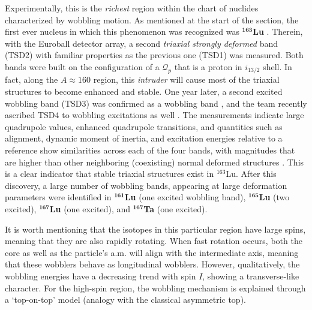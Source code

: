 Experimentally, this is the \emph{richest} region within the chart of nuclides characterized by wobbling motion. As mentioned at the start of the section, the first ever nucleus in which this phenomenon was recognized was $^\mathbf{163}$\textbf{Lu} \cite{odegaard2001evidence}. Therein, with the Euroball detector \cite{simpson1997euroball} array, a second \emph{triaxial strongly deformed} band (TSD2) with familiar properties as the previous one (TSD1) was measured. Both bands were built on the configuration of a $\mathcal{Q}_p$ that is a proton in $i_{13/2}$ shell. In fact, along the $A\approx 160$ region, this \emph{intruder} will cause most of the triaxial structures to become enhanced and stable. One year later, a second excited wobbling band (TSD3) was confirmed as a wobbling band \cite{jensen2002evidence}, and the team recently ascribed TSD4 to wobbling excitations as well \cite{raduta2020towards}. The measurements indicate large quadrupole values, enhanced quadrupole transitions, and quantities such as alignment, dynamic moment of inertia, and excitation energies relative to a reference show similarities across each of the four bands, with magnitudes that are higher than other neighboring (coexisting) normal deformed structures \cite{jensen2004coexisting}. This is a clear indicator that stable triaxial structures exist in $^{163}$Lu. After this discovery, a large number of wobbling bands, appearing at large deformation parameters were identified in $^\mathbf{161}$\textbf{Lu} \cite{bringel2005evidence} (one excited wobbling band), $^\mathbf{165}$\textbf{Lu} \cite{schonwasser2003one} (two excited), $^\mathbf{167}$\textbf{Lu} \cite{amro2003wobbling} (one excited), and $^\mathbf{167}$\textbf{Ta} \cite{hartley2009wobbling} (one excited).

It is worth mentioning that the isotopes in this particular region have large spins, meaning that they are also rapidly rotating. When fast rotation occurs, both the core as well as the particle's a.m. will align with the intermediate axis, meaning that these wobblers behave as longitudinal wobblers. However, qualitatively, the wobbling energies have a decreasing trend with spin $I$, showing a transverse-like character. For the high-spin region, the wobbling mechanism is explained through a `top-on-top' model \cite{hamamoto2002wobbling,tanabe2006algebraic} (analogy with the classical asymmetric top).

